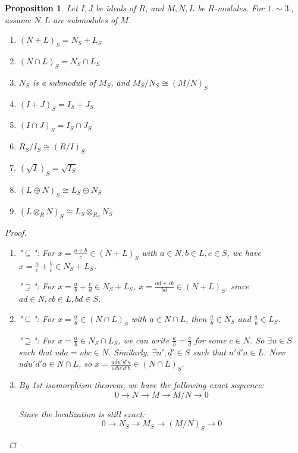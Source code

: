 \documentclass[a4paper]{article}
\theoremstyle{mystyle}
\newtheorem{prop}{Proposition}
\begin{document}
\begin{prop}
  Let $I, J$ be ideals of $R$, and $M, N, L$ be $R$-modules. 
  For $1. \sim 3.$, assume $N, L$ are submodules of $M$.
  \begin{enumerate}
    \itemsep=-1.5pt
    \item $(N+L)_S = N_S + L_S$
    \item $(N \cap L)_S = N_S \cap L_S$
    \item $N_S$ is a submodule of $M_S$, and $M_S / N_S \cong (M/N)_S$
    \item $(I+J)_S = I_S + J_S$
    \item $(I \cap J)_S = I_S \cap J_S$
    \item $R_S / I_S \cong (R/I)_{\bar{S}}$
    \item $(\sqrt{I})_S = \sqrt{I_S}$
    \item $(L\oplus N)_S \cong L_S \oplus N_S$
    \item $(L \otimes_R N)_S \cong L_S \otimes_{R_S} N_S$
  \end{enumerate}

  \begin{proof}
    $ $
    \begin{enumerate}
      \item 
        "$\subseteq$":
        For $x = \frac{a+b}{c} \in (N+L)_S$ with $a \in N, b \in L, c \in S$,
        we have $x = \frac{a}{c} + \frac{b}{c} \in N_S + L_S$.

        "$\supseteq$":
        For $x = \frac{a}{b} + \frac{c}{d} \in N_S + L_S$, 
        $x = \frac{ad+cb}{bd} \in (N+L)_S$, since $ad \in N, cb \in L, bd \in S$.

      \item 
        "$\subseteq$":
        For $x = \frac{a}{b} \in (N \cap L)_S$ with $a \in N \cap L$, 
        then $\frac{a}{b} \in N_S$ and $\frac{a}{b} \in L_S$.

        "$\supseteq$":
        For $x = \frac{a}{b} \in N_S \cap L_S$, we can write 
        $\frac{a}{b} = \frac{c}{d}$ for some $c \in N$. 
        So $\exists u \in S$ such that $uda = ubc \in N$.
        Similarly, $\exists u', d' \in S$ such that $u'd'a \in L$.
        Now $udu'd'a \in N \cap L$, so $x = \frac{udu'd'a}{udu'd'b} \in 
        (N \cap L)_S$.

      \item 
        By 1st isomorphism theorem, we have the following exact sequence:
        \[
          0 \to N \to M \to M/N \to 0
        \]

        Since the localization is still exact:
        \[
          0 \to N_S \to M_S \to (M/N)_S \to 0
        \]


\end{enumerate}
\end{proof}
\end{prop}
\end{document}
